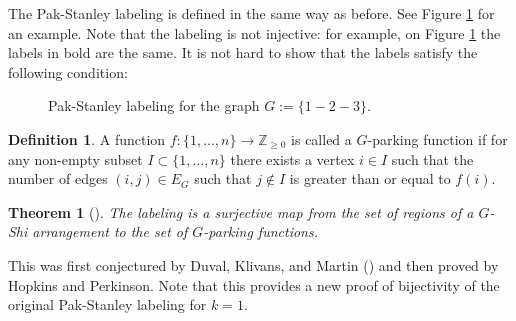 \documentclass[12pt]{amsart}
\newcommand{\ZZ}{\mathbb{Z}_{\ge 0}}
\newtheorem{theorem}{Theorem}[section]
\theoremstyle{definition}
\newtheorem{definition}{Definition}[section]
\begin{document}
The Pak-Stanley labeling is defined in the same way as before. See Figure \ref{Figure: GPS labeling} for an example. Note that the labeling is not injective: for example, on Figure \ref{Figure: GPS labeling} the labels in bold are the same. It is not hard to show that the labels satisfy the following condition:


\begin{figure}
\begin{center}
\end{center}
\caption{Pak-Stanley labeling for the graph $G:=\{1-2-3\}.$}\label{Figure: GPS labeling}
\end{figure}

\begin{definition}
A function $f:\{1,\ldots,n\}\to\ZZ$ is called a {$G$-parking function} if for any non-empty subset $I\subset\{1,\ldots,n\}$ there exists a vertex $i\in I$ such that the number of edges $(i,j)\in E_G$ such that $j\notin I$ is greater than or equal to $f(i).$
\end{definition}

\begin{theorem}[\cite{HP12}]
The labeling is a surjective map from the set of regions of a $G$-Shi arrangement to the set of $G$-parking functions.
\end{theorem}
This was first conjectured by Duval, Klivans, and Martin (\cite{DKM11}) and then proved by Hopkins and Perkinson. Note that this provides a new proof of bijectivity of the original Pak-Stanley labeling for $k=1.$
\end{document}

